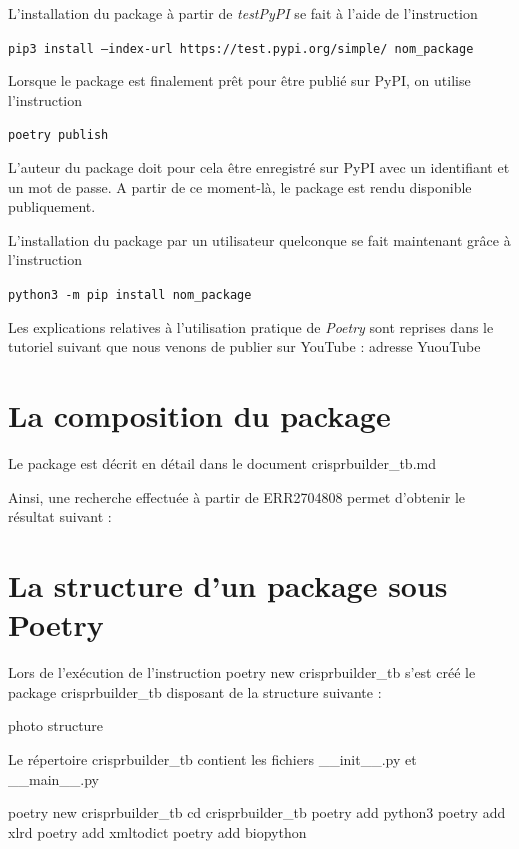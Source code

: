 \documentclass[twoside,a4paper,11pt,frenchb,openany]{report}
\begin{document}
L'installation du package à partir de \textit{testPyPI} se fait à l'aide de l'instruction
\begin{tcolorbox}\texttt{pip3 install --index-url https://test.pypi.org/simple/ nom\_package}\end{tcolorbox}

Lorsque le package est finalement prêt pour être publié sur PyPI, on utilise l’instruction
\begin{tcolorbox}\texttt{poetry publish}\end{tcolorbox}
L'auteur du package doit pour cela être enregistré sur PyPI avec un identifiant et un mot de passe. A partir de ce moment-là, le package est rendu disponible publiquement.

L’installation du package par un utilisateur quelconque se fait maintenant grâce à l’instruction
\begin{tcolorbox}\texttt{python3 -m pip install nom\_package}\end{tcolorbox}

Les explications relatives à l’utilisation pratique de \textit{Poetry} sont reprises dans le tutoriel suivant que nous venons de publier sur YouTube : adresse YuouTube




	
	\section{La composition du package}

Le package est décrit en détail dans le document crisprbuilder\_tb.md


Ainsi, une recherche effectuée à partir de ERR2704808 permet d'obtenir le résultat suivant :


\section{La structure d'un package sous Poetry}

Lors de l'exécution de l'instruction poetry new crisprbuilder\_tb s'est créé le package crisprbuilder\_tb disposant de la structure suivante :

photo structure

Le répertoire crisprbuilder\_tb contient les fichiers \_\_init\_\_.py et \_\_main\_\_.py


poetry new crisprbuilder\_tb
cd crisprbuilder\_tb
poetry add python3
poetry add xlrd
poetry add xmltodict
poetry add biopython
\end{document}
